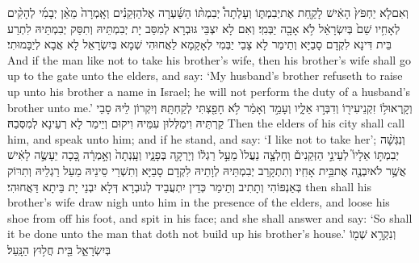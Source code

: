 {וְאִם\maqqaf לֹ֤א יַחְפֹּץ֙ הָאִ֔ישׁ לָקַ֖חַת אֶת\maqqaf יְבִמְתּ֑וֹ וְעָלְתָה֩ יְבִמְתּ֨וֹ הַשַּׁ֜עְרָה אֶל\maqqaf הַזְּקֵנִ֗ים וְאָֽמְרָה֙ מֵאֵ֨ן יְבָמִ֜י לְהָקִ֨ים לְאָחִ֥יו שֵׁם֙ בְּיִשְׂרָאֵ֔ל לֹ֥א אָבָ֖ה יַבְּמִֽי׃}
{וְאִם לָא יִצְבֵּי גּוּבְרָא לְמִסַּב יָת יְבִמְתֵּיהּ וְתִסַּק יְבִמְתֵּיהּ לִתְרַע בֵּית דִּינָא לִקְדָם סָבַיָּא וְתֵימַר לָא צָבֵי יַבְּמִי לְאָקָמָא לַאֲחוּהִי שְׁמָא בְּיִשְׂרָאֵל לָא אֲבָא לְיַבָּמוּתִי׃}
{And if the man like not to take his brother’s wife, then his brother’s wife shall go up to the gate unto the elders, and say: ‘My husband’s brother refuseth to raise up unto his brother a name in Israel; he will not perform the duty of a husband’s brother unto me.’}{}
{וְקָֽרְאוּ\maqqaf ל֥וֹ זִקְנֵי\maqqaf עִיר֖וֹ וְדִבְּר֣וּ אֵלָ֑יו וְעָמַ֣ד וְאָמַ֔ר לֹ֥א חָפַ֖צְתִּי לְקַחְתָּֽהּ׃}
{וְיִקְרוֹן לֵיהּ סָבֵי קַרְתֵּיהּ וִימַלְּלוּן עִמֵּיהּ וִיקוּם וְיֵימַר לָא רְעֵינָא לְמִסְּבַהּ׃}
{Then the elders of his city shall call him, and speak unto him; and if he stand, and say: ‘I like not to take her’;}{}
{וְנִגְּשָׁ֨ה יְבִמְתּ֣וֹ אֵלָיו֮ לְעֵינֵ֣י הַזְּקֵנִים֒ וְחָלְצָ֤ה נַעֲלוֹ֙ מֵעַ֣ל רַגְל֔וֹ וְיָרְקָ֖ה בְּפָנָ֑יו וְעָֽנְתָה֙ וְאָ֣מְרָ֔ה כָּ֚כָה יֵעָשֶׂ֣ה לָאִ֔ישׁ אֲשֶׁ֥ר לֹא\maqqaf יִבְנֶ֖ה אֶת\maqqaf בֵּ֥ית אָחִֽיו׃}
{וְתִתְקָרַב יְבִמְתֵּיהּ לְוָתֵיהּ לִקְדָם סָבַיָּא וְתִשְׁרֵי סֵינֵיהּ מֵעַל רַגְלֵיהּ וְתִרּוֹק בְּאַנְפּוֹהִי וְתָתִיב וְתֵימַר כְּדֵין יִתְעֲבֵיד לְגוּבְרָא דְּלָא יִבְנֵי יָת בֵּיתָא דַּאֲחוּהִי׃}
{then shall his brother’s wife draw nigh unto him in the presence of the elders, and loose his shoe from off his foot, and spit in his face; and she shall answer and say: ‘So shall it be done unto the man that doth not build up his brother’s house.’}{}
{וְנִקְרָ֥א שְׁמ֖וֹ בְּיִשְׂרָאֵ֑ל בֵּ֖ית חֲל֥וּץ הַנָּֽעַל׃ \setuma }

